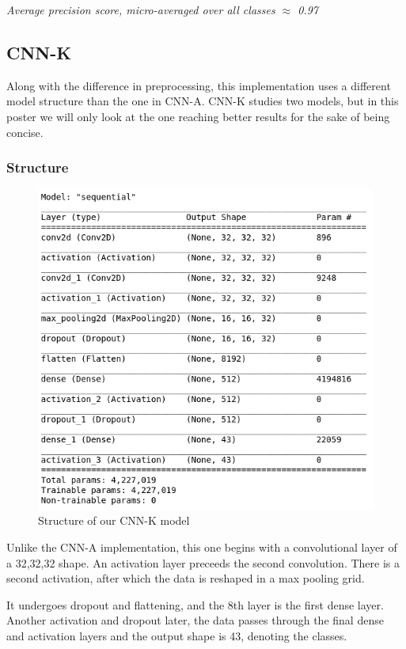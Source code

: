 \documentclass[12pt, landscape]{article}
\begin{document}
\begin{multicols}{3}
\begin{center}
\emph{Average precision score, micro-averaged over all classes $\approx$ 0.97}
\end{center}


\subsection{CNN-K}
Along with the difference in preprocessing, this implementation uses a different
model structure than the one in CNN-A. CNN-K studies two models, but in this
poster we will only look at the one reaching better results for the sake of
being concise.

\subsubsection{Structure}
\begin{figure}[H]
    \centerline{\includegraphics[scale = 0.5]{figuremodel1.png}}
    \caption{Structure of our CNN-K model}
    \label{fig:CNNKstructure}
\end{figure}
Unlike the CNN-A implementation, this one begins with a convolutional layer of a
32,32,32 shape. An activation layer preceeds the second convolution. There is a
second activation, after which the data is reshaped in a max pooling grid.

It undergoes dropout and flattening, and the 8th layer is the first dense layer.
Another activation and dropout later, the data passes through the final dense
and activation layers and the output shape is 43, denoting the classes.


\end{multicols}
\end{document}
